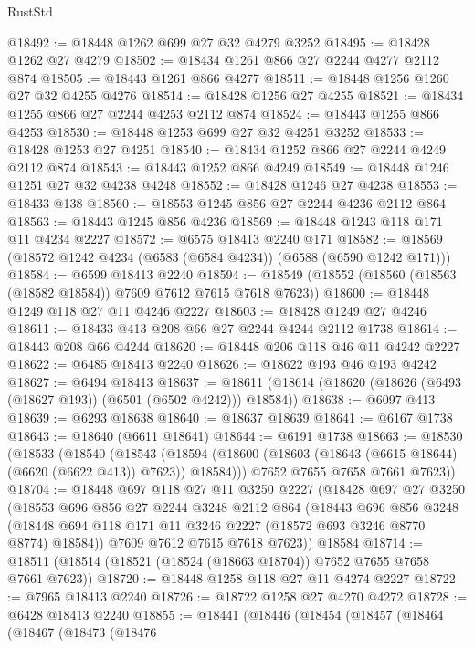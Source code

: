 \begin{lexlean}{RustStd}
\begin{coremodule}
@18492 := @18448 @1262 @699 @27 @32 @4279 @3252
@18495 := @18428 @1262 @27 @4279
@18502 := @18434 @1261 @866 @27 @2244 @4277 @2112 @874
@18505 := @18443 @1261 @866 @4277
@18511 := @18448 @1256 @1260 @27 @32 @4255 @4276
@18514 := @18428 @1256 @27 @4255
@18521 := @18434 @1255 @866 @27 @2244 @4253 @2112 @874
@18524 := @18443 @1255 @866 @4253
@18530 := @18448 @1253 @699 @27 @32 @4251 @3252
@18533 := @18428 @1253 @27 @4251
@18540 := @18434 @1252 @866 @27 @2244 @4249 @2112 @874
@18543 := @18443 @1252 @866 @4249
@18549 := @18448 @1246 @1251 @27 @32 @4238 @4248
@18552 := @18428 @1246 @27 @4238
@18553 := @18433 @138
@18560 := @18553 @1245 @856 @27 @2244 @4236 @2112 @864
@18563 := @18443 @1245 @856 @4236
@18569 := @18448 @1243 @118 @171 @11 @4234 @2227
@18572 := @6575 @18413 @2240 @171
@18582 := @18569 (@18572 @1242 @4234 (@6583 (@6584 @4234)) (@6588 (@6590 @1242 @171)))
@18584 := @6599 @18413 @2240
@18594 := @18549 (@18552 (@18560 (@18563 (@18582 @18584)) @7609 @7612 @7615 @7618 @7623))
@18600 := @18448 @1249 @118 @27 @11 @4246 @2227
@18603 := @18428 @1249 @27 @4246
@18611 := @18433 @413 @208 @66 @27 @2244 @4244 @2112 @1738
@18614 := @18443 @208 @66 @4244
@18620 := @18448 @206 @118 @46 @11 @4242 @2227
@18622 := @6485 @18413 @2240
@18626 := @18622 @193 @46 @193 @4242
@18627 := @6494 @18413
@18637 := @18611 (@18614 (@18620 (@18626 (@6493 (@18627 @193)) (@6501 (@6502 @4242))) @18584))
@18638 := @6097 @413
@18639 := @6293 @18638
@18640 := @18637 @18639
@18641 := @6167 @1738
@18643 := @18640 (@6611 @18641)
@18644 := @6191 @1738
@18663 := @18530
    (@18533
      (@18540
        (@18543
          (@18594 (@18600 (@18603 (@18643 (@6615 @18644) (@6620 (@6622 @413)) @7623)) @18584)))
        @7652
        @7655
        @7658
        @7661
        @7623))
@18704 := @18448
    @697
    @118
    @27
    @11
    @3250
    @2227
    (@18428
      @697
      @27
      @3250
      (@18553
        @696
        @856
        @27
        @2244
        @3248
        @2112
        @864
        (@18443
          @696
          @856
          @3248
          (@18448 @694 @118 @171 @11 @3246 @2227 (@18572 @693 @3246 @8770 @8774) @18584))
        @7609
        @7612
        @7615
        @7618
        @7623))
    @18584
@18714 := @18511 (@18514 (@18521 (@18524 (@18663 @18704)) @7652 @7655 @7658 @7661 @7623))
@18720 := @18448 @1258 @118 @27 @11 @4274 @2227
@18722 := @7965 @18413 @2240
@18726 := @18722 @1258 @27 @4270 @4272
@18728 := @6428 @18413 @2240
@18855 := @18441
    (@18446
      (@18454
        (@18457
          (@18464
            (@18467
              (@18473
                (@18476

\end{coremodule}
\end{lexlean}
